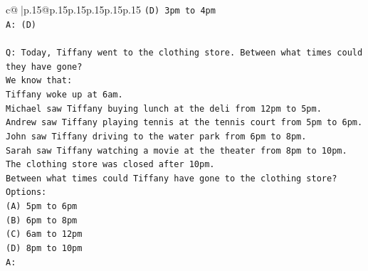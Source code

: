 \documentclass{article}
\begin{document}
{\begin{supertabular}{c@{$\;$}|p{.15\linewidth}@{}p{.15\linewidth}p{.15\linewidth}p{.15\linewidth}p{.15\linewidth}p{.15\linewidth}}
{{{\texttt{(D) 3pm to 4pm} \\
\texttt{A: (D)} \\
\\ 
\texttt{Q: Today, Tiffany went to the clothing store. Between what times could they have gone?} \\
\texttt{We know that:} \\
\texttt{Tiffany woke up at 6am.} \\
\texttt{Michael saw Tiffany buying lunch at the deli from 12pm to 5pm.} \\
\texttt{Andrew saw Tiffany playing tennis at the tennis court from 5pm to 6pm.} \\
\texttt{John saw Tiffany driving to the water park from 6pm to 8pm.} \\
\texttt{Sarah saw Tiffany watching a movie at the theater from 8pm to 10pm.} \\
\texttt{The clothing store was closed after 10pm.} \\
\texttt{Between what times could Tiffany have gone to the clothing store?} \\
\texttt{Options:} \\
\texttt{(A) 5pm to 6pm} \\
\texttt{(B) 6pm to 8pm} \\
\texttt{(C) 6am to 12pm} \\
\texttt{(D) 8pm to 10pm} \\
\texttt{A:} \\
            }
        }
    }
     \\ \\


\end{supertabular}}
\end{document}
